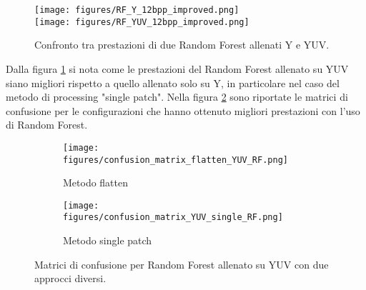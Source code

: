 \begin{figure}[H]
    \centering
    \texttt{[image: figures/RF\_Y\_12bpp\_improved.png]}\\[0.5cm]
    \texttt{[image: figures/RF\_YUV\_12bpp\_improved.png]}
    \caption{Confronto tra prestazioni di due Random Forest allenati Y e YUV.}
    \label{fig:RF_YvsYUV}
\end{figure}
Dalla figura \ref{fig:RF_YvsYUV} si nota come le prestazioni del Random Forest allenato su YUV siano  migliori rispetto a quello allenato solo su Y, in particolare nel caso del metodo di processing "single patch".
Nella figura \ref{fig:RF_YUV_confusion} sono riportate le matrici di confusione per le configurazioni che hanno ottenuto migliori prestazioni con l'uso di Random Forest.
\begin{figure}[H]
    \centering
    \begin{subfigure}[b]{0.45\textwidth}
        \centering
        \texttt{[image: figures/confusion\_matrix\_flatten\_YUV\_RF.png]}
        \caption{Metodo flatten}
    \end{subfigure}
    \hfill
    \begin{subfigure}[b]{0.45\textwidth}
        \centering
        \texttt{[image: figures/confusion\_matrix\_YUV\_single\_RF.png]}
        \caption{Metodo single patch}
    \end{subfigure}
    \caption{Matrici di confusione per Random Forest allenato su YUV con due approcci diversi.}
    \label{fig:RF_YUV_confusion}
\end{figure}

